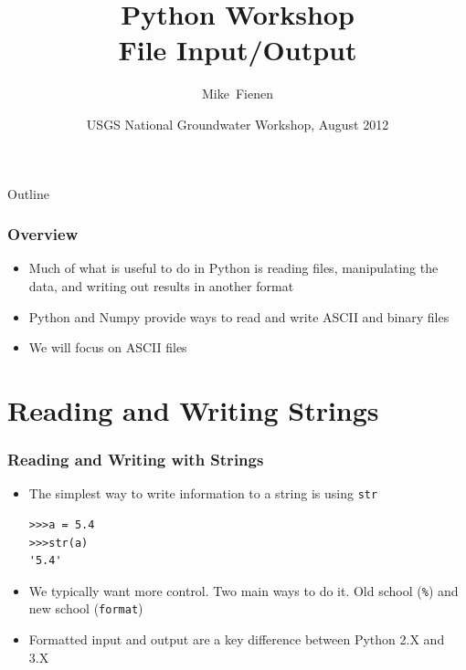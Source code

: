\documentclass{beamer}
\title[]{Python Workshop\\
File Input/Output}
\author[Fienen] %
{Mike~Fienen}
\institute[USGS] %
{
  U.S. Geological Survey\\
  Wisconsin Water Science Center, Middleton, Wisconsin USA
  }
\date[UQ12] %
{USGS National Groundwater Workshop, August 2012}
\begin{document}
\begin{frame}
  \titlepage
\end{frame}

\begin{frame}{Outline}
\tableofcontents
\end{frame}

\begin{frame}[fragile]
\frametitle{Overview}
\begin{itemize}

\item Much of what is useful to do in Python is reading files, manipulating the data, and writing out results in another format
\item Python and Numpy provide ways to read and write ASCII and binary files
\item We will focus on ASCII files
\end{itemize}
\end{frame}


\section{Reading and Writing Strings}

\begin{frame}[fragile]
\frametitle{Reading and Writing with Strings}
\begin{itemize}
\item The simplest way to write information to a string is using \texttt{str}
\begin{lstlisting}
>>>a = 5.4
>>>str(a)
'5.4'
\end{lstlisting}
\item We typically want more control. Two main ways to do it. Old school (\texttt{\%}) and new school (\texttt{format})
\item Formatted input and output are a key difference between Python 2.X and 3.X

\end{itemize}
\end{frame}
\end{document}
